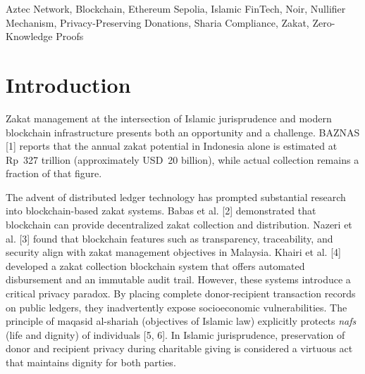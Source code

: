 \documentclass[conference]{IEEEtran}
\begin{document}
\begin{IEEEkeywords}
Aztec Network, Blockchain, Ethereum Sepolia, Islamic FinTech, Noir, Nullifier Mechanism, Privacy-Preserving Donations, Sharia Compliance, Zakat, Zero-Knowledge Proofs
\end{IEEEkeywords}

\section{Introduction}

Zakat management at the intersection of Islamic jurisprudence and modern blockchain infrastructure presents both an opportunity and a challenge. BAZNAS [1] reports that the annual zakat potential in Indonesia alone is estimated at Rp~327 trillion (approximately USD~20 billion), while actual collection remains a fraction of that figure.

The advent of distributed ledger technology has prompted substantial research into blockchain-based zakat systems. Babas et al. [2] demonstrated that blockchain can provide decentralized zakat collection and distribution. Nazeri et al. [3] found that blockchain features such as transparency, traceability, and security align with zakat management objectives in Malaysia. Khairi et al. [4] developed a zakat collection blockchain system that offers automated disbursement and an immutable audit trail. However, these systems introduce a critical privacy paradox. By placing complete donor-recipient transaction records on public ledgers, they inadvertently expose socioeconomic vulnerabilities. The principle of maqasid al-shariah (objectives of Islamic law) explicitly protects \textit{nafs} (life and dignity) of individuals [5, 6]. In Islamic jurisprudence, preservation of donor and recipient privacy during charitable giving is considered a virtuous act that maintains dignity for both parties.
\end{document}
